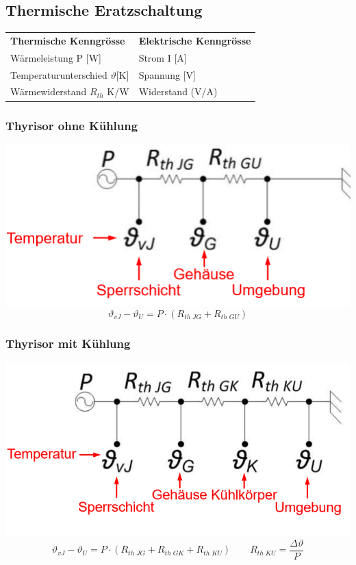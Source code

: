 \subsection{Thermische Eratzschaltung}
\begin{tabular}{ll}
	\textbf{Thermische Kenngrösse}			& \textbf{Elektrische Kenngrösse}\\
	Wärmeleistung P [W]						& Strom I  [A]\\
	Temperaturunterschied $ \vartheta $[K] 	& Spannung [V]\\
	Wärmewiderstand $ R_{th} $ {K/W}		& Widerstand (V/A)\\
\end{tabular}

\begin{multicols}{2}
	\begin{minipage}{\linewidth}
		\subsubsection{Thyrisor ohne Kühlung}
		\includegraphics[width=0.5\linewidth]{images/thyrOK}
		\[ \vartheta_{vJ}-\vartheta_U=P \cdot (R_{th\; JG}+R_{th\; GU}) \]		
	\end{minipage}

	\begin{minipage}{\linewidth}
		\subsubsection{Thyrisor mit Kühlung}
		\includegraphics[width=0.5\linewidth]{images/thyrMK}
		\[ \vartheta_{vJ}-\vartheta_U=P \cdot (R_{th\; JG}+R_{th\; GK}+R_{th\; KU})\qquad R_{th \; KU}=\dfrac{\Delta \vartheta}{P} \]	
	\end{minipage}
\end{multicols}

